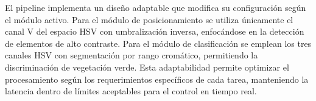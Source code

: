 El pipeline implementa un diseño adaptable que modifica su configuración según el módulo activo. Para el módulo de posicionamiento se utiliza únicamente el canal V del espacio HSV con umbralización inversa, enfocándose en la detección de elementos de alto contraste. Para el módulo de clasificación se emplean los tres canales HSV con segmentación por rango cromático, permitiendo la discriminación de vegetación verde. Esta adaptabilidad permite optimizar el procesamiento según los requerimientos específicos de cada tarea, manteniendo la latencia dentro de límites aceptables para el control en tiempo real.